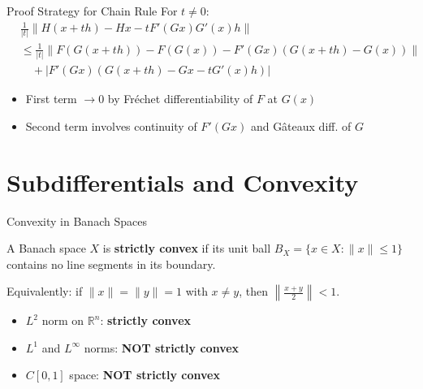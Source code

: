 \documentclass[aspectratio=169,10pt]{beamer}
\begin{document}
\begin{frame}{Proof Strategy for Chain Rule}
  For $t \neq 0$:
  \[
    \begin{split}
      &\frac{1}{|t|}\|H(x + th) - Hx - tF'(Gx)G'(x)h\| \\
      &\leq \frac{1}{|t|}\|F(G(x+th)) - F(G(x)) - F'(Gx)(G(x+th) - G(x))\| \\
      &\quad + |F'(Gx)(G(x+th) - Gx - tG'(x)h)|
    \end{split}
  \]

  \begin{itemize}
    \item First term $\to 0$ by Fréchet differentiability of $F$ at $G(x)$
    \item Second term involves continuity of $F'(Gx)$ and Gâteaux diff. of $G$
  \end{itemize}
\end{frame}


\section{Subdifferentials and Convexity}

\begin{frame}{Convexity in Banach Spaces}
  \begin{definition}
    A Banach space $X$ is \textbf{strictly convex} if its unit ball $B_X = \{x \in X: \|x\| \leq 1\}$ contains no line segments in its boundary.

    Equivalently: if $\|x\| = \|y\| = 1$ with $x \neq y$, then $\left\|\frac{x+y}{2}\right\| < 1$.
  \end{definition}

  \begin{example}
    \begin{itemize}
      \item $L^2$ norm on $\mathbb{R}^n$: \textbf{strictly convex}
      \item $L^1$ and $L^\infty$ norms: \textbf{NOT strictly convex}
      \item $C[0,1]$ space: \textbf{NOT strictly convex}
    \end{itemize}
  \end{example}
\end{frame}
\end{document}
